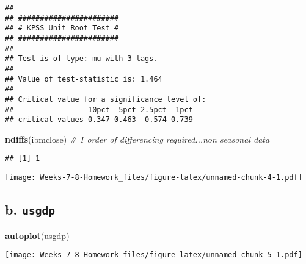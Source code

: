 \documentclass[]{article}
\newenvironment{Shaded}{\begin{snugshade}}{\end{snugshade}}
\newcommand{\CommentTok}[1]{\textcolor[rgb]{0.56,0.35,0.01}{\textit{#1}}}
\newcommand{\KeywordTok}[1]{\textcolor[rgb]{0.13,0.29,0.53}{\textbf{#1}}}
\newcommand{\NormalTok}[1]{#1}
\newcommand{\OperatorTok}[1]{\textcolor[rgb]{0.81,0.36,0.00}{\textbf{#1}}}
\newcommand{\StringTok}[1]{\textcolor[rgb]{0.31,0.60,0.02}{#1}}
\begin{document}
\begin{verbatim}
## 
## ####################### 
## # KPSS Unit Root Test # 
## ####################### 
## 
## Test is of type: mu with 3 lags. 
## 
## Value of test-statistic is: 1.464 
## 
## Critical value for a significance level of: 
##                 10pct  5pct 2.5pct  1pct
## critical values 0.347 0.463  0.574 0.739
\end{verbatim}

\begin{Shaded}
\begin{Highlighting}[]
\KeywordTok{ndiffs}\NormalTok{(ibmclose) }\CommentTok{# 1 order of differencing required...non seasonal data}
\end{Highlighting}
\end{Shaded}

\begin{verbatim}
## [1] 1
\end{verbatim}

\begin{Shaded}
\end{Shaded}

\texttt{[image: Weeks-7-8-Homework\_files/figure-latex/unnamed-chunk-4-1.pdf]}

\hypertarget{b.-usgdp}{%
\subsection{\texorpdfstring{b.
\texttt{usgdp}}{b. usgdp}}\label{b.-usgdp}}

\begin{Shaded}
\begin{Highlighting}[]
\KeywordTok{autoplot}\NormalTok{(usgdp)}
\end{Highlighting}
\end{Shaded}

\texttt{[image: Weeks-7-8-Homework\_files/figure-latex/unnamed-chunk-5-1.pdf]}

\begin{Shaded}
\end{Shaded}
\end{document}
